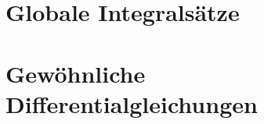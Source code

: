 \documentclass[a4paper,leqno]{article}
\begin{document}
\vspace{2\baselineskip}



\pagebreak

\section{Globale Integralsätze}

\vspace{1\baselineskip}



\vspace{2\baselineskip}



\pagebreak



\vspace{2\baselineskip}



\pagebreak

\section{Gewöhnliche Differentialgleichungen}

\vspace{1\baselineskip}



\vspace{2\baselineskip}


\end{document}
